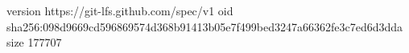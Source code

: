version https://git-lfs.github.com/spec/v1
oid sha256:098d9669cd596869574d368b91413b05e7f499bed3247a66362fe3c7ed6d3dda
size 177707
